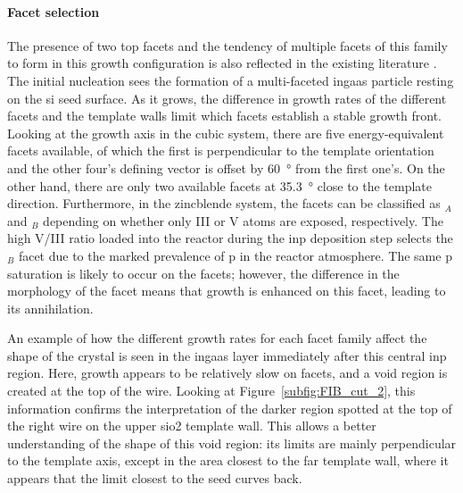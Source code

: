 \paragraph{Facet selection} The presence of two top  facets and the tendency of multiple facets of this family to form in this growth configuration is also reflected in the existing literature \cite{Borg2014, Schmid2015, Borg2015, Knoedler2017}. The initial nucleation sees the formation of a multi-faceted \acs{ingaas} particle resting on the \acl{si} seed surface. As it grows, the difference in growth rates of the different facets and the template walls limit which facets establish a stable growth front. Looking at the \hkl[1 1 0] growth axis in the cubic system, there are five energy-equivalent  facets available, of which the first is perpendicular to the template orientation and the other four's defining vector is offset by \qty{60}{\degree} from the first one's. On the other hand, there are only two available  facets at \qty{35.3}{\degree} close to the template direction. Furthermore, in the zincblende system, the  facets can be classified as \(_A\) and \(_B\) depending on whether only III or V atoms are exposed, respectively. The high V/III ratio loaded into the reactor during the \acs{inp} deposition step selects the \(_B\) facet due to the marked prevalence of \acl{p} in the reactor atmosphere. The same \acl{p} saturation is likely to occur on the  facets; however, the difference in the morphology of the facet means that growth is enhanced on this facet, leading to its annihilation.

An example of how the different growth rates for each facet family affect the shape of the crystal is seen in the \acs{ingaas} layer immediately after this central \acs{inp} region. Here, growth appears to be relatively slow on  facets, and a void region is created at the top of the wire. Looking at Figure~\ref{subfig:FIB_cut_2}, this information confirms the interpretation of the darker region spotted at the top of the right wire on the upper \acs{sio2} template wall. This allows a better understanding of the shape of this void region: its limits are mainly perpendicular to the template axis, except in the area closest to the far template wall, where it appears that the limit closest to the seed curves back.
\par
